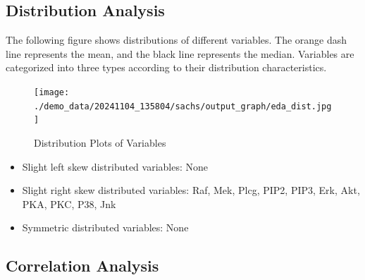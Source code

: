 \documentclass{article}
\begin{document}
\subsection{Distribution Analysis}
The following figure shows distributions of different variables. The orange dash line represents the mean, 
and the black line represents the median. Variables are categorized into three types according to their distribution characteristics.

\begin{figure}[H]
\centering
\texttt{[image: ./demo\_data/20241104\_135804/sachs/output\_graph/eda\_dist.jpg]}
\caption{\label{fig:dist}Distribution Plots of Variables}
\end{figure}

\begin{itemize}
\item Slight left skew distributed variables: None
\item Slight right skew distributed variables: Raf, Mek, Plcg, PIP2, PIP3, Erk, Akt, PKA, PKC, P38, Jnk
\item Symmetric distributed variables: None
\end{itemize}

\subsection{Correlation Analysis}
\end{document}
